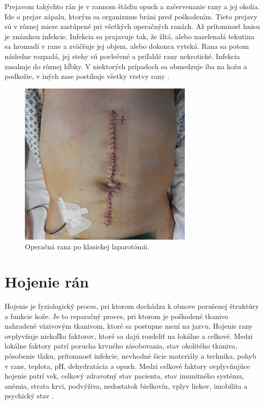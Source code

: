 Prejavom takýchto rán je v rannom štádiu opuch a začervenanie rany a jej okolia. Ide o prejav zápalu, ktorým sa organizmus bráni pred poškodením. Tieto prejavy sú v rôznej miere zastúpené pri všetkých operačných ranách. Až prítomnosť hnisu je známkou infekcie. Infekcia sa prajavuje tak, že žltá, alebo nazelenalá tekutina sa hromadí v rane a zväčšuje jej objem, alebo dokonca vyteká. Rana sa potom následne rozpadá, jej stehy sú povlečené a priľahlé rany nekrotické. Infekcia zasahuje do rôznej hĺbky. V niektorých prípadoch sa obmedzuje iba na kožu a podkožie, v iných zase postihuje všetky vrstvy rany \cite{pcCdSrbbhhlr5YcQ}.
\begin{figure}[h]
  \centering
  \includegraphics[scale=1]{fig/pooperacna-rana.png}
  \caption{Operačná rana po klasickej laparotómii. \cite{XUKYT8x1LmEzzkqO}}
  \label{fig:pooperacna-rana}
\end{figure}

\section{Hojenie rán}
Hojenie je fyziologický proces, pri ktorom dochádza k obnove porušenej štruktúry a funkcie kože. Je to reparačný proces, pri ktorom je poškodené tkanivo nahradené väzivovým tkanivom, ktoré sa postupne mení na jazvu. Hojenie rany ovplyvňuje niekoľǩo faktorov, ktoré sa dajú rozdeliť na lokálne a celkové. Medzi lokálne faktory patrí porucha krvného zásobovania, stav okolitého tkaniva, pôsobenie tlaku, prítomnosť infekcie, nevhodné šicie materiály a technika, pohyb v rane, teplota, pH, dehydratácia a opuch. Medzi celkové faktory ovplyvňujúce hojenie patrí vek, celkový zdravotný stav pacienta, stav imunitného systému, anémia, strata krvi, podvýživa, nedostatok bielkovín, vplyv liekov, imobilita a psychický stav \cite{pcCdSrbbhhlr5YcQ, Pokorna2012}.


